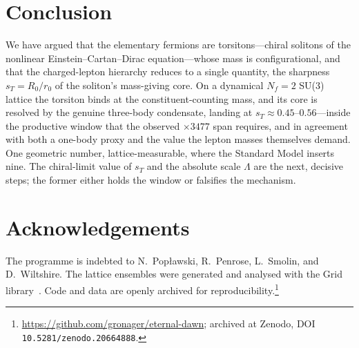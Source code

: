 \documentclass[aps,prd,reprint,nofootinbib,superscriptaddress]{revtex4-2}
\newcommand{\sT}{s_{T}}
\begin{document}
\section{Conclusion}
\label{sec:conclusion}

We have argued that the elementary fermions are torsitons---chiral solitons of the nonlinear
Einstein--Cartan--Dirac equation---whose mass is configurational, and that the charged-lepton hierarchy
reduces to a single quantity, the sharpness $\sT = R_0/r_0$ of the soliton's mass-giving core. On a
dynamical $N_f=2$ SU(3) lattice the torsiton binds at the constituent-counting mass, and its core is
resolved by the genuine three-body condensate, landing at $\sT \approx 0.45$--$0.56$---inside the
productive window that the observed $\times 3477$ span requires, and in agreement with both a one-body
proxy and the value the lepton masses themselves demand. One geometric number, lattice-measurable,
where the Standard Model inserts nine. The chiral-limit value of $\sT$ and the absolute scale $\Lambda$
are the next, decisive steps; the former either holds the window or falsifies the mechanism.

\section*{Acknowledgements}
The programme is indebted to N.~Pop\l{}awski, R.~Penrose, L.~Smolin, and D.~Wiltshire. The lattice
ensembles were generated and analysed with the Grid library~\citep{grid}. Code and data are openly
archived for reproducibility.\footnote{\url{https://github.com/gronager/eternal-dawn}; archived at Zenodo,
DOI \texttt{10.5281/zenodo.20664888}.}



\end{document}
